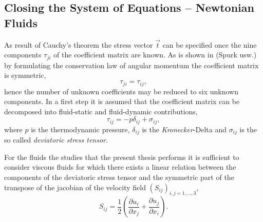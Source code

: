     \subsection{Closing the System of Equations -- Newtonian Fluids}
    \label{sec:fundclosing}

    As result of Cauchy's theorem the stress vector \( \vec{t} \) can be specified once the nine components \(\tau_{ji}\) of the coefficient matrix are known. As is shown in (Spurk usw.) by formulating the conservation law of angular momentum the coefficient matrix is symmetric, 
    \begin{equation}
      \label{eq:stresssymetry}
      \tau_{ji} = \tau_{ij},
    \end{equation}
    hence the number of unknown coefficients may be reduced to six unknown components. In a first step it is assumed that the coefficient matrix can be decomposed into fluid-static and fluid-dynamic contributions,
    \begin{displaymath}
      \tau_{ij} = -p \delta_{ij} + \sigma_{ij},
    \end{displaymath}
    where \(p\) is the thermodynamic pressure, \(\delta_{ij}\) is the \emph{Kronecker}-Delta and \( \sigma_{ij} \) is the so called \emph{deviatoric stress tensor}. 
    
    For the fluids the studies that the present thesis performs it is sufficient to consider viscous fluids for which there exists a linear relation between the components of the deviatoric stress tensor and the symmetric part of the transpose of the jacobian of the velocity field \(\left( S_{ij} \right)_{i,j=1,\dots,3}\),
    \begin{displaymath}
      S_{ij} = \frac{1}{2} \left( \frac{\partial u_i}{\partial x_j} + \frac{\partial u_j}{\partial x_i} \right).
    \end{displaymath}


